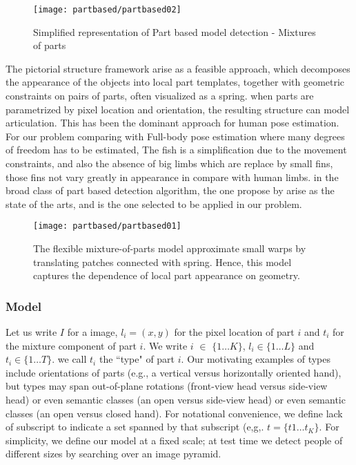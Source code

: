 \begin{figure}[ht]
\centering
\texttt{[image: partbased/partbased02]}
\caption{Simplified representation of Part based model detection - Mixtures of parts}
\label{fig:partbesed02}
\end{figure}

The pictorial structure framework arise as a feasible approach, which decomposes the appearance
of the objects into local part templates, together with geometric constraints on pairs of parts, 
often visualized as a spring. when parts are parametrized by pixel location and orientation, 
the resulting structure can model articulation. This has been the dominant approach for human
pose estimation. For our problem comparing with Full-body pose estimation where many degrees 
of freedom has to be estimated, The fish is a simplification due to the movement constraints,
and also the absence of big limbs which are replace by small fins, those fins not vary 
greatly in appearance in compare with human limbs. in the broad class of part based 
detection algorithm, the one propose by \citet{Ramanan2012} arise as the state of 
the arts, and is the one selected to be applied in
our problem.



\begin{figure}[ht]
\centering
\texttt{[image: partbased/partbased01]}
\caption{The flexible mixture-of-parts model approximate small warps by translating patches connected with spring.
Hence, this model captures the dependence of local part appearance on geometry.}
\label{fig:partbesed01}
\end{figure}

\subsubsection{Model}
Let us write $I$ for a image, $l_i = (x,y)$ for the pixel location of part $i$ and $t_i$ 
for the mixture component of part $i$. We write $i$ $\in$  $\{1\dotsc K\}$, $l_i \in \{1\dotsc L\}$ 
and $t_i \in \{1\dotsc T\}$. we call $t_i$ the ``type" of part $i$.
 Our motivating examples of types include orientations of parts 
(e.g., a vertical versus horizontally oriented hand), but types may span out-of-plane
rotations (front-view head versus side-view head) or even semantic classes 
(an open versus side-view head) or even semantic classes (an open versus closed hand). 
For notational convenience, we define lack of subscript to indicate a set spanned by that subscript
(e,g,. $t=\{t1\dotsc t_K\}$. For simplicity, we define our model at a fixed scale; 
at test time we detect people of different sizes by searching over an image pyramid.

